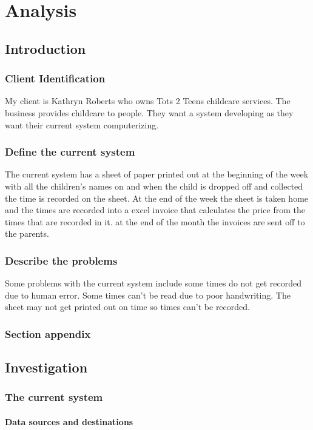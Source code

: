 \chapter{Analysis}

\section{Introduction}

\subsection{Client Identification}
My client is Kathryn Roberts who owns Tots 2 Teens childcare services. The business provides childcare to people. They want a system developing as they want their current system computerizing.
\subsection{Define the current system}
The current system has a sheet of paper printed out at the beginning of the week with all the children's names on and when the child is dropped off and collected the time is recorded on the sheet. At the end of the week the sheet is taken home and the times are recorded into a excel invoice that calculates the price from the times that are recorded in it. at the end of the month the invoices are sent off to the parents.
\subsection{Describe the problems}
Some problems with the current system include some times do not get recorded due to human error. Some times can't be read due to poor handwriting. The sheet may not get printed out on time so times can't be recorded.
\subsection{Section appendix}

\section{Investigation}

\subsection{The current system}

\subsubsection{Data sources and destinations}

